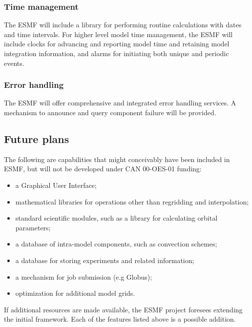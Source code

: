\subsubsection{Time management}

The ESMF will include a library for performing routine 
calculations with dates and time intervals.  For higher level model
time management, the ESMF will include clocks for advancing and 
reporting model time and retaining model integration information, 
and alarms for initiating both unique and periodic events.

\subsubsection{Error handling}

The ESMF will offer comprehensive and integrated error handling
services.  A mechanism to announce and query component failure will be
provided.

\subsection{Future plans}

The following are capabilities that might conceivably have been
included in ESMF, but will not be developed under CAN 00-OES-01
funding:
\begin{itemize}
\item a Graphical User Interface;
\item mathematical libraries for operations other than regridding and
  interpolation;
\item standard scientific modules, such as a library for calculating
  orbital parameters;
\item a database of intra-model components, such as convection schemes;
\item a database for storing experiments and related information;
\item a mechanism for job submission (e.g Globus);
\item optimization for additional model grids.
\end{itemize}

If additional resources are made available, the ESMF project foresees
extending the initial framework.  Each of the features listed above is
a possible addition.




















